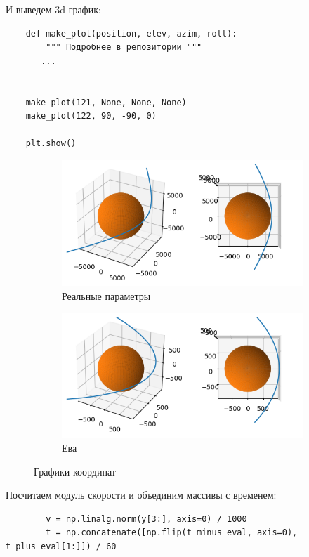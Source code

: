 \documentclass{article}
\begin{document}
    И выведем 3d график:
    \begin{verbatim}
    def make_plot(position, elev, azim, roll):
        """ Подробнее в репозитории """
       ...

       
    make_plot(121, None, None, None)
    make_plot(122, 90, -90, 0)
    
    plt.show()
    \end{verbatim}
    \begin{figure}
    \begin{subfigure}{0.5\textwidth}
        \includegraphics[width=1\linewidth]{images/coordinates_graph.png}
        \caption{Реальные параметры}
    \end{subfigure}
    \begin{subfigure}{0.5\textwidth}
        \includegraphics[width=1\linewidth]{images/eve_coordinates.png}
        \caption{Ева}
    \end{subfigure}
    \caption{Графики координат}
    \end{figure}
    Посчитаем модуль скорости и объединим массивы с временем:
    \begin{verbatim}
        v = np.linalg.norm(y[3:], axis=0) / 1000
        t = np.concatenate([np.flip(t_minus_eval, axis=0), t_plus_eval[1:]]) / 60
    \end{verbatim}
\end{document}
